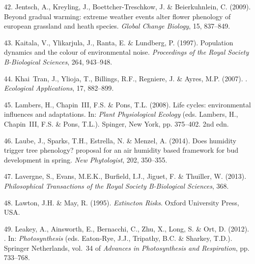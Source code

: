 \documentclass[11pt,a4paper,oneside]{article}
\begin{document}
\begin{thebibliography}{79}
42. Jentsch, A., Kreyling, J., Boettcher-Treschkow, J. \& Beierkuhnlein, C. (2009).
\newblock Beyond gradual warming: extreme weather events alter flower phenology
  of european grassland and heath species.
\newblock \emph{Global Change Biology}, 15, 837--849.

43. Kaitala, V., Ylikarjula, J., Ranta, E. \& Lundberg, P. (1997).
\newblock Population dynamics and the colour of environmental noise.
\newblock \emph{Proceedings of the Royal Society B-Biological Sciences}, 264,
  943--948.

44. Khai~Tran, J., Ylioja, T., Billings, R.F., Regniere, J. \& Ayres, M.P.
  ({2007}).
.
\newblock \emph{Ecological Applications}, {17}, {882--899}.

45. Lambers, H., Chapin~III, F.S. \& Pons, T.L. (2008).
\newblock Life cycles: environmental influences and adaptations.
\newblock In: \emph{Plant Physiological Ecology} (eds. Lambers, H., Chapin~III,
  F.S. \& Pons, T.L.).
\newblock Spinger, New York, pp. 375--402. 2nd edn.

46. Laube, J., Sparks, T.H., Estrella, N. \& Menzel, A. (2014).
\newblock Does humidity trigger tree phenology? proposal for an air humidity
  based framework for bud development in spring.
\newblock \emph{New Phytologist}, 202, 350--355.

47. Lavergne, S., Evans, M.E.K., Burfield, I.J., Jiguet, F. \& Thuiller, W.
  ({2013}).
\newblock \emph{Philosophical Transactions of the Royal Society B-Biological
  Sciences}, {368}.

48. Lawton, J.H. \& May, R. (1995).
\newblock \emph{Extincton Risks}.
\newblock Oxford University Press, USA.

49. Leakey, A., Ainsworth, E., Bernacchi, C., Zhu, X., Long, S. \& Ort, D. (2012).
.
\newblock In: \emph{Photosynthesis} (eds. Eaton-Rye, J.J., Tripathy, B.C. \&
  Sharkey, T.D.).
\newblock Springer Netherlands, vol.~34 of \emph{Advances in Photosynthesis and
  Respiration}, pp. 733--768.


\end{thebibliography}
\end{document}
